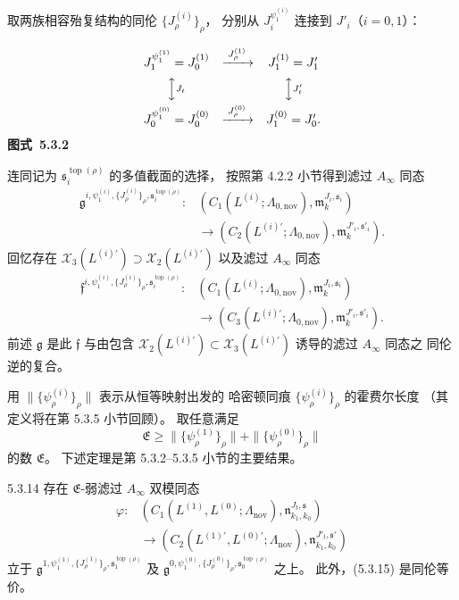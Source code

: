 取两族相容殆复结构的同伦
$\{J^{(i)}_\rho\}_\rho$，
分别从 $J_i^{\psi^{(i)}_1}$
连接到 $J'_i$（$i=0,1$）：
\begin{center}
\[
\begin{array}{ccc}
J_1^{\psi^{(1)}_1}=J^{(1)}_0
 &\xrightarrow{\;J^{(1)}_\rho\;}&
J^{(1)}_1=J'_1\\[2mm]
\Big\updownarrow\vcenter{\hbox{\scriptsize$J_t$}}
 &&\Big\updownarrow\vcenter{\hbox{\scriptsize$J'_t$}}\\[2mm]
J_0^{\psi^{(0)}_1}=J^{(0)}_0
 &\xrightarrow{\;J^{(0)}_\rho\;}&
J^{(0)}_1=J'_0 .
\end{array}
\]
\renewcommand{\thefigure}{5.3.2}
{\normalfont\bfseries 图式~\thefigure}\label{diag:5-3-2}
\end{center}
连同记为
$\mathfrak s_i^{\operatorname{top}(\rho)}$
的多值截面的选择，
按照第 4.2.2 小节得到滤过
$A_\infty$ 同态
\[
\begin{aligned}
\mathfrak g^{i,\psi^{(i)}_1,\{J^{(i)}_\rho\}_\rho,
 \mathfrak s_i^{\operatorname{top}(\rho)}}:
&(C_1(L^{(i)};\Lambda_{0,\mathrm{nov}}),
 \mathfrak m_k^{J_i,\mathfrak s_i})
\\
&\longrightarrow
(C_2(L^{(i)\prime};\Lambda_{0,\mathrm{nov}}),
 \mathfrak m_k^{J'_i,\mathfrak s'_i}).
\end{aligned}
\]
回忆存在
$\mathcal X_3(L^{(i)\prime})
\supset\mathcal X_2(L^{(i)\prime})$
以及滤过 $A_\infty$ 同态
\[
\begin{aligned}
\mathfrak f^{i,\psi^{(i)}_1,\{J^{(i)}_\rho\}_\rho,
 \mathfrak s_i^{\operatorname{top}(\rho)}}:
&(C_1(L^{(i)};\Lambda_{0,\mathrm{nov}}),
 \mathfrak m_k^{J_i,\mathfrak s_i})
\\
&\longrightarrow
(C_3(L^{(i)\prime};\Lambda_{0,\mathrm{nov}}),
 \mathfrak m_k^{J'_i,\mathfrak s'_i}).
\end{aligned}
\]
前述 $\mathfrak g$ 是此 $\mathfrak f$
与由包含
$\mathcal X_2(L^{(i)\prime})
\subset\mathcal X_3(L^{(i)\prime})$
诱导的滤过 $A_\infty$ 同态之
同伦逆的复合。

用
$\|\{\psi^{(i)}_\rho\}_\rho\|$
表示从恒等映射出发的
哈密顿同痕
$\{\psi^{(i)}_\rho\}_\rho$
的霍费尔长度
（其定义将在第 5.3.5 小节回顾）。
取任意满足
\[
\mathfrak E\ge
\|\{\psi^{(1)}_\rho\}_\rho\|
+\|\{\psi^{(0)}_\rho\}_\rho\|
\]
的数 $\mathfrak E$。
下述定理是第 5.3.2--5.3.5
小节的主要结果。
\begin{theorem}{5.3.14}\label{thm:5-3-14}
存在 $\mathfrak E$-弱滤过
$A_\infty$ 双模同态
\begin{equation}
\begin{aligned}
\varphi\colon
&(C_1(L^{(1)},L^{(0)};\Lambda_{\mathrm{nov}}),
 \mathfrak n_{k_1,k_0}^{J_t,\mathfrak s})
\\
&\longrightarrow
(C_2(L^{(1)\prime},L^{(0)\prime};
 \Lambda_{\mathrm{nov}}),
 \mathfrak n_{k_1,k_0}^{J'_t,\mathfrak s'})
\end{aligned}
\tag{5.3.15}\label{eq:5-3-15}
\end{equation}
立于
$\mathfrak g^{1,\psi^{(1)}_1,
 \{J^{(1)}_\rho\}_\rho,
 \mathfrak s_1^{\operatorname{top}(\rho)}}$
及
$\mathfrak g^{0,\psi^{(0)}_1,
 \{J^{(0)}_\rho\}_\rho,
 \mathfrak s_0^{\operatorname{top}(\rho)}}$
之上。
此外，(5.3.15) 是同伦等价。
\end{theorem}

